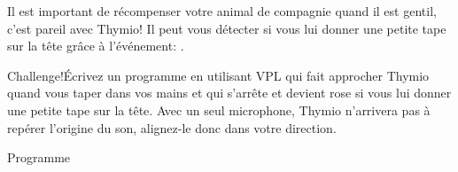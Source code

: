 
Il est important de récompenser votre animal de compagnie quand il est gentil, c'est pareil avec Thymio! Il peut vous détecter si vous lui donner une petite tape sur la tête grâce à  l'événement: . 

\begin{bclogo}[couleur = pink!30, arrondi = 0.1, logo = \bccrayon, ombre = true]{Challenge!}Écrivez un programme en utilisant VPL qui fait approcher Thymio quand vous taper dans vos mains et qui s'arrête et devient rose si vous lui donner une petite tape sur la tête. Avec un seul microphone, Thymio n'arrivera pas à repérer l'origine du son, alignez-le donc dans votre direction.
\end{bclogo}

{\raggedleft \hfill Programme }